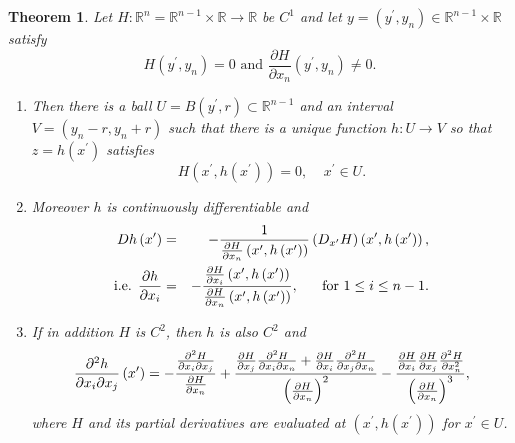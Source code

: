 \documentclass{amsart}
\newtheorem{theorem}{Theorem}[section]
\theoremstyle{plain}
\numberwithin{equation}{section}
\begin{document}
\begin{theorem}
\label{IFT}Let $H:\mathbb{R}^{n}=\mathbb{R}^{n-1}\times \mathbb{R}%
\rightarrow \mathbb{R}$ be $C^{1}$ and let $y=\left( y^{\prime
},y_{n}\right) \in \mathbb{R}^{n-1}\times \mathbb{R}$ satisfy%
\begin{equation*}
H\left( y^{\prime },y_{n}\right) =0\text{ and }\frac{\partial H}{\partial
x_{n}}\left( y^{\prime },y_{n}\right) \not=0.
\end{equation*}

\begin{enumerate}
\item Then there is a ball $U=B\left( y^{\prime },r\right) \subset \mathbb{R}%
^{n-1}$ and an interval $V=\left( y_{n}-r,y_{n}+r\right) $ such that there
is a unique function $h:U\rightarrow V$ so that $z=h\left( x^{\prime
}\right) $ satisfies 
\begin{equation*}
H\left( x^{\prime },h\left( x^{\prime }\right) \right) =0,\ \ \ \ \
x^{\prime }\in U.
\end{equation*}

\item Moreover $h$ is continuously differentiable and%
\begin{eqnarray*}
Dh\left( x^{\prime }\right) &=&-\frac{1}{\frac{\partial H}{\partial x_{n}}%
\left( x^{\prime },h\left( x^{\prime }\right) \right) }\left( D_{x^{\prime
}}H\right) \left( x^{\prime },h\left( x^{\prime }\right) \right) , \\
\text{i.e. }\frac{\partial h}{\partial x_{i}} &=&-\frac{\frac{\partial H}{%
\partial x_{i}}\left( x^{\prime },h\left( x^{\prime }\right) \right) }{\frac{%
\partial H}{\partial x_{n}}\left( x^{\prime },h\left( x^{\prime }\right)
\right) },\ \ \ \ \ \text{for }1\leq i\leq n-1.
\end{eqnarray*}

\item If in addition $H$ is $C^{2}$, then $h$ is also $C^{2}$ and%
\begin{equation*}
\frac{\partial ^{2}h}{\partial x_{i}\partial x_{j}}\left( x^{\prime }\right)
=-\frac{\frac{\partial ^{2}H}{\partial x_{i}\partial x_{j}}}{\frac{\partial H%
}{\partial x_{n}}}+\frac{\frac{\partial H}{\partial x_{j}}\frac{\partial
^{2}H}{\partial x_{i}\partial x_{n}}+\frac{\partial H}{\partial x_{i}}\frac{%
\partial ^{2}H}{\partial x_{j}\partial x_{n}}}{\left( \frac{\partial H}{%
\partial x_{n}}\right) ^{2}}-\frac{\frac{\partial H}{\partial x_{i}}\frac{%
\partial H}{\partial x_{j}}\frac{\partial ^{2}H}{\partial x_{n}^{2}}}{\left( 
\frac{\partial H}{\partial x_{n}}\right) ^{3}},
\end{equation*}%
where $H$ and its partial derivatives are evaluated at $\left( x^{\prime
},h\left( x^{\prime }\right) \right) $ for $x^{\prime }\in U$.


\end{enumerate}
\end{theorem}
\end{document}
